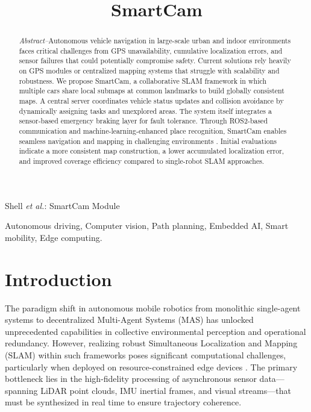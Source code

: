 \documentclass[journal,transmag]{IEEEtran}
\begin{document}
%
\title{
  \textbf{SmartCam}
}

\author{
}

%
{Shell \MakeLowercase{\textit{et al.}}: SmartCam Module}

\maketitle %

\begin{abstract}
\textit{Abstract--}Autonomous vehicle navigation in large-scale urban and indoor environments faces critical challenges from GPS unavailability, cumulative localization errors, and sensor failures that could potentially compromise safety. Current solutions rely heavily on GPS modules or centralized mapping systems that struggle with scalability and robustness. We propose SmartCam, a collaborative SLAM framework in which multiple cars share local submaps at common landmarks to build globally consistent maps. A central server coordinates vehicle status updates and collision avoidance by dynamically assigning tasks and unexplored areas. The system itself integrates a sensor-based emergency braking layer for fault tolerance. Through ROS2-based communication and machine-learning-enhanced place recognition, SmartCam enables seamless navigation and mapping in challenging environments \cite{Quigley2009}. Initial evaluations indicate a more consistent map construction, a lower accumulated localization error, and improved coverage efficiency compared to single-robot SLAM approaches.

\end{abstract}

\begin{IEEEkeywords}
Autonomous driving, Computer vision, Path planning, Embedded AI, Smart mobility, Edge computing.
\end{IEEEkeywords}


\section{Introduction}
The paradigm shift in autonomous mobile robotics from monolithic single-agent systems to decentralized Multi-Agent Systems (MAS) has unlocked unprecedented capabilities in collective environmental perception and operational redundancy. However, realizing robust Simultaneous Localization and Mapping (SLAM) within such frameworks poses significant computational challenges, particularly when deployed on resource-constrained edge devices \cite{Cadena2016}. The primary bottleneck lies in the high-fidelity processing of asynchronous sensor data—spanning LiDAR point clouds, IMU inertial frames, and visual streams—that must be synthesized in real time to ensure trajectory coherence.
\end{document}
